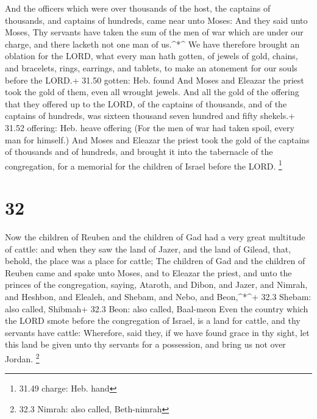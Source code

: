 And the officers which were over thousands of the host,
the captains of thousands, and captains of hundreds, came near unto
Moses:  And they said unto Moses, Thy servants have taken
the sum of the men of war which are under our charge, and there lacketh
not one man of us.\^{}*\^{}  We have therefore brought an
oblation for the LORD, what every man hath gotten, of jewels of gold,
chains, and bracelets, rings, earrings, and tablets, to make an
atonement for our souls before the LORD.+ 31.50 gotten: Heb. found
 And Moses and Eleazar the priest took the gold of them,
even all wrought jewels.  And all the gold of the offering
that they offered up to the LORD, of the captains of thousands, and of
the captains of hundreds, was sixteen thousand seven hundred and fifty
shekels.+ 31.52 offering: Heb. heave offering  (For the men
of war had taken spoil, every man for himself.)  And Moses
and Eleazar the priest took the gold of the captains of thousands and of
hundreds, and brought it into the tabernacle of the congregation, for a
memorial for the children of Israel before the LORD. \footnote{31.49
  charge: Heb. hand}

\hypertarget{section-31}{%
\section{32}\label{section-31}}

 Now the children of Reuben and the children of Gad had a
very great multitude of cattle: and when they saw the land of Jazer, and
the land of Gilead, that, behold, the place was a place for cattle;
 The children of Gad and the children of Reuben came and
spake unto Moses, and to Eleazar the priest, and unto the princes of the
congregation, saying,  Ataroth, and Dibon, and Jazer, and
Nimrah, and Heshbon, and Elealeh, and Shebam, and Nebo, and
Beon,\^{}*\^{}+ 32.3 Shebam: also called, Shibmah+ 32.3 Beon: also
called, Baal-meon  Even the country which the LORD smote
before the congregation of Israel, is a land for cattle, and thy
servants have cattle:  Wherefore, said they, if we have
found grace in thy sight, let this land be given unto thy servants for a
possession, and bring us not over Jordan. \footnote{32.3 Nimrah: also
  called, Beth-nimrah}

